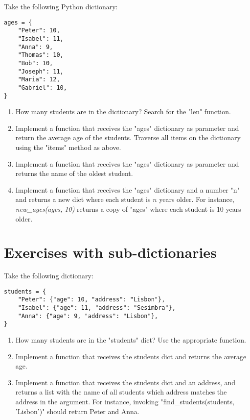 Take the following Python dictionary:

\begin{verbatim}
ages = {
    "Peter": 10,
    "Isabel": 11,
    "Anna": 9,
    "Thomas": 10,
    "Bob": 10,
    "Joseph": 11,
    "Maria": 12,
    "Gabriel": 10,
}
\end{verbatim}

\begin{enumerate}

\item How many students are in the dictionary? Search for the "len" function.

\item Implement a function that receives the "ages" dictionary as parameter and return the average age of the students. Traverse all items on the dictionary using the "items" method as above.

\item Implement a function that receives the "ages" dictionary as parameter and returns the name of the oldest student.

\item Implement a function that receives the "ages" dictionary and a number "n" and returns a new dict where each student is $n$ years older. For instance, \textit{new\_ages(ages, 10)} returns a copy of "ages" where each student is 10 years older.

\end{enumerate}

\section{Exercises with sub-dictionaries}

Take the following dictionary:

\begin{verbatim}
students = {
    "Peter": {"age": 10, "address": "Lisbon"},
    "Isabel": {"age": 11, "address": "Sesimbra"},
    "Anna": {"age": 9, "address": "Lisbon"},
}
\end{verbatim}

\begin{enumerate}

\item How many students are in the "students" dict? Use the appropriate function.

\item Implement a function that receives the students dict and returns the average age.

\item Implement a function that receives the students dict and an address, and returns a list with the name of all students which address matches the address in the argument. For instance, invoking "find\_students(students, 'Lisbon')" should return Peter and Anna. 

\end{enumerate}
